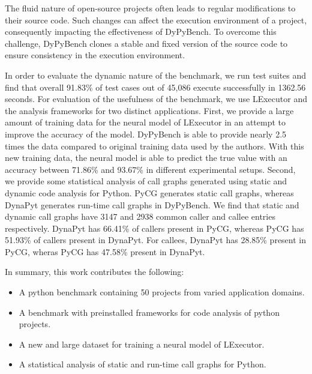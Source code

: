 The fluid nature of open-source projects often leads to regular modifications to their source code.
Such changes can affect the execution environment of a project, consequently impacting the effectiveness of DyPyBench.
To overcome this challenge, DyPyBench clones a stable and fixed version of the source code to ensure consistency in the execution environment.

In order to evaluate the dynamic nature of the benchmark, we run test suites and find that overall 91.83\% of test cases out of 45,086 execute successfully in 1362.56 seconds.
For evaluation of the usefulness of the benchmark, we use LExecutor and the analysis frameworks for two distinct applications.
First, we provide a large amount of training data for the neural model of LExecutor in an attempt to improve the accuracy of the model.
DyPyBench is able to provide nearly 2.5 times the data compared to original training data used by the authors.
With this new training data, the neural model is able to predict the true value with an accuracy between 71.86\% and 93.67\% in different experimental setups.
Second, we provide some statistical analysis of call graphs generated using static and dynamic code analysis for Python.
PyCG generates static call graphs, whereas DynaPyt generates run-time call graphs in DyPyBench.
We find that static and dynamic call graphs have 3147 and 2938 common caller and callee entries respectively.
DynaPyt has 66.41\% of callers present in PyCG, whereas PyCG has 51.93\% of callers present in DynaPyt.
For callees, DynaPyt has 28.85\% present in PyCG, wheras PyCG has 47.58\% present in DynaPyt.

In summary, this work contributes the following:
\begin{itemize}
    \item A python benchmark containing 50 projects from varied application domains.
    \item A benchmark with preinstalled frameworks for code analysis of python projects.
    \item A new and large dataset for training a neural model of LExecutor.
    \item A statistical analysis of static and run-time call graphs for Python.
\end{itemize}
